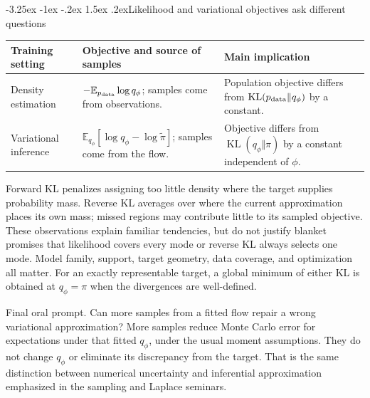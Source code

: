 \documentclass[11pt,a4paper]{article}
\makeatletter
\newcommand{\E}{\mathbb E}
\newcommand{\KL}{\operatorname{KL}}
\renewcommand\subsection{\@startsection{subsection}{2}{\z@}%
  {-3.25ex \@plus -1ex \@minus -.2ex}%
  {1.5ex \@plus .2ex}{\normalfont\large}}
\makeatother
\begin{document}
\subsection{Likelihood and variational objectives ask different questions}
\begin{center}
\begin{tabular}{@{}p{32mm}p{60mm}p{65mm}@{}}
\toprule
Training setting & Objective and source of samples & Main implication \\
\midrule
Density estimation & $-\E_{p_{\rm data}}\log q_\phi$;
samples come from observations. & {\raggedright Population objective differs from
$\KL(p_{\rm data}\Vert q_\phi)$ by a constant.\par} \\
{\raggedright Variational inference\par} & $\E_{q_\phi}[\log q_\phi-\log\widetilde\pi]$;
samples come from the flow. & Objective differs from
$\KL(q_\phi\Vert\pi)$ by a constant independent of $\phi$. \\
\bottomrule
\end{tabular}
\end{center}

Forward KL penalizes assigning too little density where the target supplies
probability mass. Reverse KL averages over where the current approximation
places its own mass; missed regions may contribute little to its sampled
objective. These observations explain familiar tendencies, but do not justify
blanket promises that likelihood covers every mode or reverse KL always
selects one mode. Model family, support, target geometry, data coverage, and
optimization all matter. For an exactly representable target, a global
minimum of either KL is obtained at $q_\phi=\pi$ when the divergences are
well-defined.

Final oral prompt. Can more samples from a fitted flow repair a wrong
variational approximation? More samples reduce Monte Carlo error for
expectations under that fitted $q_\phi$, under the usual moment assumptions.
They do not change $q_\phi$ or eliminate its discrepancy from the target.
That is the same distinction between numerical uncertainty and inferential
approximation emphasized in the sampling and Laplace seminars.
\end{document}
